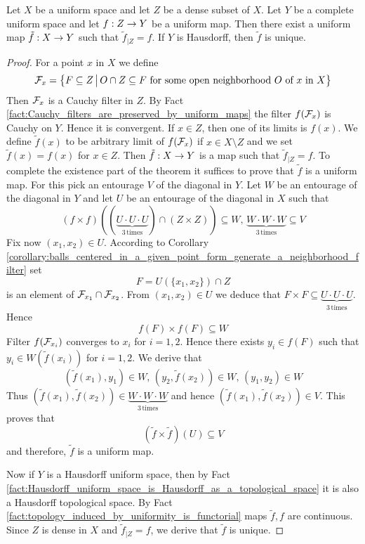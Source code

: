 \documentclass[10pt]{amsart}
\begin{document}
\begin{theorem}\label{theorem:extension_of_densely_defined_uniform_maps_with_complete_target}
	Let $X$ be a uniform space and let $Z$ be a dense subset of $X$. Let $Y$ be a complete uniform space and let $f:Z\rightarrow Y$ be a uniform map. Then there exist a uniform map $\tilde{f}:X\rightarrow Y$ such that $\tilde{f}_{\mid Z} = f$. If $Y$ is Hausdorff, then $\tilde{f}$ is unique.
\end{theorem}
\begin{proof}
	For a point $x$ in $X$ we define
	$${\mathcal F}_x = \big\{F\subseteq Z\,\big|\,O\cap Z \subseteq F\mbox{ for some open neighborhood }O\mbox{ of }x\mbox{ in }X\big\}$$
	Then ${\mathcal F}_x$ is a Cauchy filter in $Z$. By Fact \ref{fact:Cauchy_filters_are_preserved_by_uniform_maps} the filter $f({\mathcal F}_x)$ is Cauchy on $Y$. Hence it is convergent. If $x \in Z$, then one of its limits is $f(x)$. We define $\tilde{f}(x)$ to be arbitrary limit of $f({\mathcal F}_x)$ if $x \in X\setminus Z$ and we set $\tilde{f}(x) = f(x)$ for $x \in Z$. Then $\tilde{f}:X\rightarrow Y$ is a map such that $\tilde{f}_{\mid Z} = f$. To complete the existence part of the theorem it suffices to prove that $\tilde{f}$ is a uniform map. For this pick an entourage $V$ of the diagonal in $Y$. Let $W$ be an entourage of the diagonal in $Y$ and let $U$ be an entourage of the diagonal in $X$ such that
	$$\left(f\times f\right)\left(\left(\underbrace{U\cdot U \cdot U}_{3\,\mathrm{times}}\right)\cap \left(Z\times Z\right)\right) \subseteq W,\,\underbrace{W\cdot W \cdot W}_{3\,\mathrm{times}} \subseteq V$$
	Fix now $(x_1,x_2) \in U$. According to Corollary \ref{corollary:balls_centered_in_a_given_point_form_generate_a_neighborhood_filter} set
	$$F = U\left(\{x_1,x_2\}\right)\cap Z$$
	is an element of ${\mathcal F}_{x_1}\cap {\mathcal F}_{x_2}$. From $(x_1,x_2) \in U$ we deduce that $F\times F \subseteq \underbrace{U\cdot U\cdot U}_{3\,\mathrm{times}}$. Hence
	$$f(F)\times f(F) \subseteq W$$
	Filter $f({\mathcal F}_{x_i})$ converges to $x_i$ for $i=1,2$. Hence there exists $y_i \in f(F)$ such that $y_i \in W\left(\tilde{f}(x_i)\right)$ for $i = 1, 2$. We derive that
	$$\left(\tilde{f}(x_1),y_1\right) \in W,\,\left(y_2,\tilde{f}(x_2)\right) \in W,\,(y_1,y_2) \in W$$
	Thus $\left(\tilde{f}(x_1),\tilde{f}(x_2)\right) \in \underbrace{W\cdot W\cdot W}_{3\,\mathrm{times}}$ and hence $\left(\tilde{f}(x_1),\tilde{f}(x_2)\right) \in V$. This proves that
	$$\left(\tilde{f}\times \tilde{f}\right)(U) \subseteq V$$
	and therefore, $\tilde{f}$ is a uniform map.

	Now if $Y$ is a Hausdorff uniform space, then by Fact \ref{fact:Hausdorff_uniform_space_is_Hausdorff_as_a_topological_space} it is also a Hausdorff topological space. By Fact \ref{fact:topology_induced_by_uniformity_is_functorial} maps $\tilde{f}, f$ are continuous. Since $Z$ is dense in $X$ and $\tilde{f}_{\mid Z} = f$, we derive that $\tilde{f}$ is unique.
\end{proof}
\end{document}

